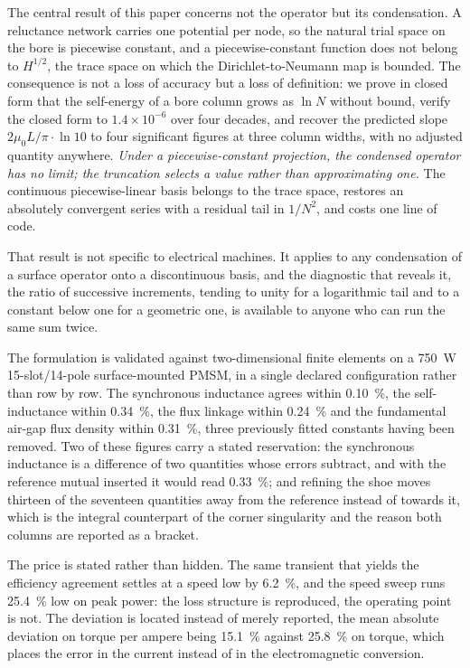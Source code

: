 \documentclass[10pt,a4paper,twocolumn]{article}
\theoremstyle{plain}
\theoremstyle{remark}
\begin{document}
The central result of this paper concerns not the operator but its
condensation. A reluctance network carries one potential per node, so
the natural trial space on the bore is piecewise constant, and a
piecewise-constant function does not belong to $H^{1/2}$, the trace
space on which the Dirichlet-to-Neumann map is bounded. The consequence
is not a loss of accuracy but a loss of definition: we prove in closed
form that the self-energy of a bore column grows as
$\ln N$ without bound, verify the closed form to $1.4\times10^{-6}$ over
four decades, and recover the predicted slope $2\mu_0L/\pi\cdot\ln 10$
to four significant figures at three column widths, with no adjusted
quantity anywhere. \emph{Under a piecewise-constant projection, the
condensed operator has no limit; the truncation selects a value rather
than approximating one.} The continuous piecewise-linear basis belongs
to the trace space, restores an absolutely convergent series with a
residual tail in $1/N^{2}$, and costs one line of code.

That result is not specific to electrical machines. It applies to any
condensation of a surface operator onto a discontinuous basis, and the
diagnostic that reveals it, the ratio of successive increments, tending
to unity for a logarithmic tail and to a constant below one for a
geometric one, is available to anyone who can run the same sum twice.

The formulation is validated against two-dimensional finite elements on
a \SI{750}{\watt} 15-slot/14-pole surface-mounted PMSM, in a single
declared configuration rather than row by row. The synchronous
inductance agrees within \SI{0.10}{\percent}, the self-inductance within
\SI{0.34}{\percent}, the flux linkage within \SI{0.24}{\percent} and the
fundamental air-gap flux density within \SI{0.31}{\percent}, three
previously fitted constants having been removed. Two of these figures
carry a stated reservation: the synchronous inductance is a difference
of two quantities whose errors subtract, and with the reference mutual
inserted it would read \SI{0.33}{\percent}; and refining the shoe moves
thirteen of the seventeen quantities away from the reference instead of
towards it, which is the integral counterpart of the corner singularity
and the reason both columns are reported as a bracket.

The price is stated rather than hidden. The same transient that yields
the efficiency agreement settles at a speed low by \SI{6.2}{\percent},
and the speed sweep runs \SI{25.4}{\percent} low on peak power: the loss
structure is reproduced, the operating point is not. The deviation is
located instead of merely reported, the mean absolute deviation on
torque per ampere being \SI{15.1}{\percent} against \SI{25.8}{\percent}
on torque, which places
the error in the current instead of in the electromagnetic conversion.
\end{document}
